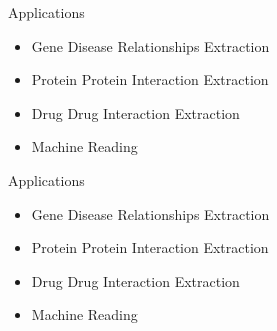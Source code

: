 \documentclass[xcolor={dvipsnames}]{beamer}
\begin{document}
\begin{frame}{\insertsection}

\begin{exampleblock}{Applications}
		\begin{itemize}
			\item Gene Disease Relationships Extraction
			\item Protein Protein Interaction Extraction
			\item Drug Drug Interaction Extraction
			\item Machine Reading
		\end{itemize}
\end{exampleblock}
\end{frame}

\begin{frame}{\insertsection}

\begin{exampleblock}{Applications}
		\begin{itemize}
			\item Gene Disease Relationships Extraction
			\item Protein Protein Interaction Extraction
			\item \alert{Drug Drug Interaction Extraction}
			\item Machine Reading
		\end{itemize}
\end{exampleblock}
\end{frame}

\begin{frame}[fragile]{\insertsection}
\end{frame}
\end{document}
